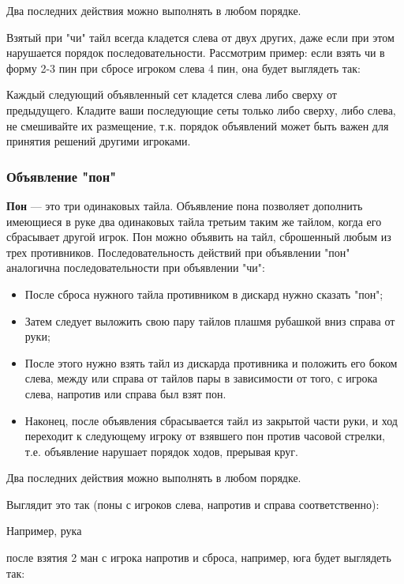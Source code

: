 Два последних действия можно выполнять в любом порядке.

Взятый при "чи" тайл всегда кладется слева от двух других, даже если при этом нарушается порядок последовательности. Рассмотрим пример: если взять чи в форму 2-3 пин при сбросе игроком слева 4 пин, она будет выглядеть так:

 \hfill {}

Каждый следующий объявленный сет кладется слева либо сверху от предыдущего. Кладите ваши последующие сеты только либо сверху, либо слева, не смешивайте их размещение, т.к. порядок объявлений может быть важен для принятия решений другими игроками.

\subsubsection{Объявление "пон" }

\textbf{Пон} --- это три одинаковых тайла. Объявление пона позволяет дополнить имеющиеся в руке два одинаковых тайла третьим таким же тайлом, когда его сбрасывает другой игрок. Пон можно объявить на тайл, сброшенный любым из трех противников. Последовательность действий при объявлении "пон" аналогична последовательности при объявлении "чи":

\begin{itemize}
	\item После сброса нужного тайла противником в дискард нужно сказать "пон";
	\item Затем следует выложить свою пару тайлов плашмя рубашкой вниз справа от руки;
	\item После этого нужно взять тайл из дискарда противника и положить его боком слева, между или справа от тайлов пары в зависимости от того, с игрока слева, напротив или справа был взят пон.
	\item Наконец, после объявления сбрасывается тайл из закрытой части руки, и ход переходит к следующему игроку от взявшего пон против часовой стрелки, т.е. объявление нарушает порядок ходов, прерывая круг.
\end{itemize}

Два последних действия можно выполнять в любом порядке.

Выглядит это так (поны с игроков слева, напротив и справа соответственно):


\begin{example}

Например, рука

\vspace{5mm}


\vspace{5mm}

после взятия 2 ман с игрока напротив и сброса, например, юга будет выглядеть так:

\vspace{5mm}

 \hfill {}

\end{example}

